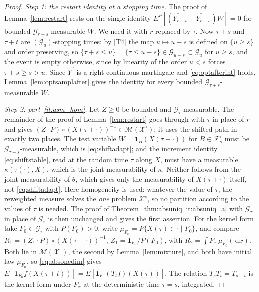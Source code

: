 \documentclass[11pt,a4paper]{article}
\theoremstyle{plain}
\theoremstyle{definition}
\theoremstyle{remark}
\newcommand{\Filt}{\mathcal{F}}
\newcommand{\Gilt}{\mathcal{G}}
\newcommand{\XX}{\mathcal{X}}                  %
\newcommand{\Msol}{\mathcal{M}}
\newcommand{\one}{\mathbf{1}}
\newcommand{\dif}{\,\mathrm{d}}
\begin{document}
\begin{proof}
  \emph{Step 1: the restart identity at a stopping time.}  The proof of
  Lemma~\ref{lem:restart} rests on the single identity
  $E^P[(\tilde{Y}^\circ_{r+t} - \tilde{Y}^\circ_{r+s})W] = 0$ for bounded
  $\Gilt_{r+s}$-measurable $W$.  We need it with $r$ replaced by $\tau$.  Now
  $\tau + s$ and $\tau + t$ are $(\Gilt_u)$-stopping times: by \eqref{T4} the map
  $u \mapsto u - s$ is defined on $\{u \geq s\}$ and order preserving, so
  $\{\tau + s \leq u\} = \{\tau \leq u - s\} \in \Gilt_{u-s} \subset \Gilt_u$ for
  $u \geq s$, and the event is empty otherwise, since by linearity of the order
  $u < s$ forces $\tau + s \geq s > u$.  Since $\tilde{Y}^\circ$ is a
  right continuous martingale and \eqref{eq:optafterint} holds,
  Lemma~\ref{lem:optsamplafter} gives the identity for every bounded
  $\Gilt_{\tau+s}$-measurable $W$.

  \emph{Step 2: part~\ref{it:asm_hom}.}  Let $Z \geq 0$ be bounded and
  $\Gilt_\tau$-measurable.  The remainder of the proof of
  Lemma~\ref{lem:restart} goes through with $\tau$ in place of $r$ and gives
  $(Z \cdot P) \circ (X(\tau+\cdot))^{-1} \in \Msol(\XX^\circ)$; it uses the
  shifted path in exactly two places.  The test variable
  $W = \one_B(X(\tau+\cdot))$ for $B \in \Filt^\circ_s$ must be
  $\Gilt_{\tau+s}$-measurable, which is \eqref{eq:shiftadapt}; and the increment
  identity \eqref{eq:shiftstable}, read at the random time $\tau$ along $X$, must
  have a measurable $\kappa(\tau(\cdot),X)$, which is the joint measurability of
  $\kappa$.  Neither follows from the joint measurability of $\theta$, which
  gives only the measurability of $X(\tau+\cdot)$ itself, not
  \eqref{eq:shiftadapt}.  Here homogeneity is used: whatever the value of $\tau$,
  the reweighted measure solves the \emph{one} problem $\XX^\circ$, so no
  partition according to the values of $\tau$ is needed.  The proof of
  Theorem~\ref{thm:absuniq}\ref{it:absuniq_a} with $\Gilt_\tau$ in place of
  $\Gilt_r$ is then unchanged and gives the first assertion.  For the kernel form
  take $F_0 \in \Gilt_\tau$ with $P(F_0) > 0$, write
  $\mu_{F_0} = P\{X(\tau) \in \cdot \mid F_0\}$, and compare
  $R_1 = (Z_1 \cdot P) \circ (X(\tau+\cdot))^{-1}$, $Z_1 = \one_{F_0}/P(F_0)$,
  with $R_2 = \int P_x \, \mu_{F_0}(\dif x)$.  Both lie in $\Msol(\XX^\circ)$, the
  second by Lemma~\ref{lem:mixture}, and both have initial law $\mu_{F_0}$, so
  \eqref{eq:absonedim} gives $E[\one_{F_0} f(X(\tau+t))] =
  E[\one_{F_0} (T_t f)(X(\tau))]$.  The relation $T_sT_t = T_{s+t}$ is the kernel
  form under $P_x$ at the deterministic time $\tau = s$, integrated.


\end{proof}
\end{document}

